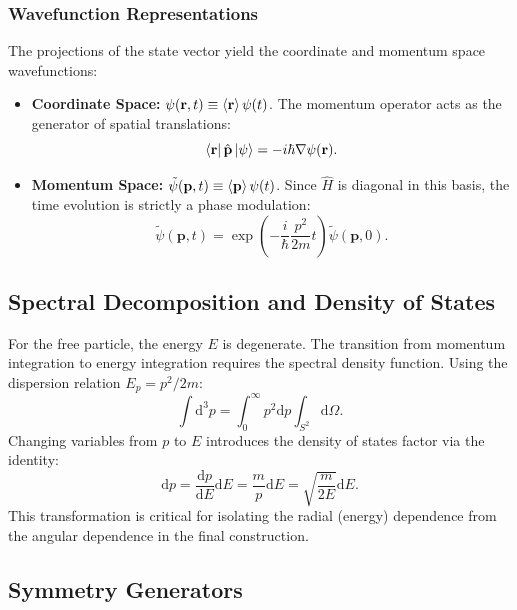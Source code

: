 \subsubsection{Wavefunction Representations}
The projections of the state vector yield the coordinate and momentum space
wavefunctions:
\begin{itemize}
  \item \textbf{Coordinate Space:} $\psi(\mathbf{r}, t) \equiv
    \braket{\mathbf{r}}{\psi(t)}$. The momentum operator acts as the generator
    of spatial translations:
    \begin{equation}
      \bra{\mathbf{r}}\hat{\mathbf{p}}\ket{\psi} = -i\hbar \nabla
      \psi(\mathbf{r}).
    \end{equation}
  \item \textbf{Momentum Space:} $\tilde{\psi}(\mathbf{p}, t) \equiv
    \braket{\mathbf{p}}{\psi(t)}$. Since $\hat{H}$ is diagonal in this basis,
    the time evolution is strictly a phase modulation:
    \begin{equation}
      \tilde{\psi}(\mathbf{p}, t) = \exp\left( -\frac{i}{\hbar}
      \frac{p^2}{2m} t \right) \tilde{\psi}(\mathbf{p}, 0).
    \end{equation}
\end{itemize}

\subsection{Spectral Decomposition and Density of States}

For the free particle, the energy $E$ is degenerate. The transition from
momentum integration to energy integration requires the spectral density
function. Using the dispersion relation $E_p = p^2/2m$:
\begin{equation}
  \int \mathrm{d}^3p = \int_0^\infty p^2 \mathrm{d}p \int_{S^2}
  \mathrm{d}\Omega.
\end{equation}
Changing variables from $p$ to $E$ introduces the density of states factor via
the identity:
\begin{equation}
  \mathrm{d}p = \frac{\mathrm{d}p}{\mathrm{d}E} \mathrm{d}E = \frac{m}{p}
  \mathrm{d}E = \sqrt{\frac{m}{2E}} \mathrm{d}E.
\end{equation}
This transformation is critical for isolating the radial (energy) dependence
from the angular dependence in the final construction.

\subsection{Symmetry Generators}

